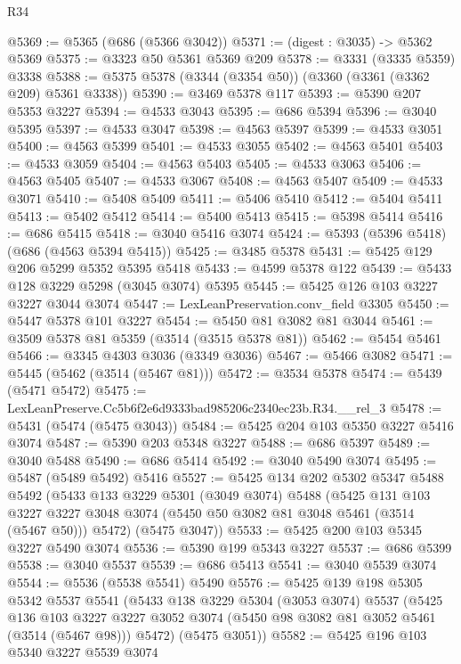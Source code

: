 \begin{lexlean}{R34}
\begin{coremodule}
@5369 := @5365 (@686 (@5366 @3042))
@5371 := (digest : @3035) -> @5362 @5369
@5375 := @3323 @50 @5361 @5369 @209
@5378 := @3331 (@3335 @5359) @3338
@5388 := @5375 @5378 (@3344 (@3354 @50)) (@3360 (@3361 (@3362 @209) @5361 @3338))
@5390 := @3469 @5378 @117
@5393 := @5390 @207 @5353 @3227
@5394 := @4533 @3043
@5395 := @686 @5394
@5396 := @3040 @5395
@5397 := @4533 @3047
@5398 := @4563 @5397
@5399 := @4533 @3051
@5400 := @4563 @5399
@5401 := @4533 @3055
@5402 := @4563 @5401
@5403 := @4533 @3059
@5404 := @4563 @5403
@5405 := @4533 @3063
@5406 := @4563 @5405
@5407 := @4533 @3067
@5408 := @4563 @5407
@5409 := @4533 @3071
@5410 := @5408 @5409
@5411 := @5406 @5410
@5412 := @5404 @5411
@5413 := @5402 @5412
@5414 := @5400 @5413
@5415 := @5398 @5414
@5416 := @686 @5415
@5418 := @3040 @5416 @3074
@5424 := @5393 (@5396 @5418) (@686 (@4563 @5394 @5415))
@5425 := @3485 @5378
@5431 := @5425 @129 @206 @5299 @5352 @5395 @5418
@5433 := @4599 @5378 @122
@5439 := @5433 @128 @3229 @5298 (@3045 @3074) @5395
@5445 := @5425 @126 @103 @3227 @3227 @3044 @3074
@5447 := LexLeanPreservation.conv_field @3305
@5450 := @5447 @5378 @101 @3227
@5454 := @5450 @81 @3082 @81 @3044
@5461 := @3509 @5378 @81 @5359 (@3514 (@3515 @5378 @81))
@5462 := @5454 @5461
@5466 := @3345 @4303 @3036 (@3349 @3036)
@5467 := @5466 @3082
@5471 := @5445 (@5462 (@3514 (@5467 @81)))
@5472 := @3534 @5378
@5474 := @5439 (@5471 @5472)
@5475 := LexLeanPreserve.Cc5b6f2e6d9333bad985206c2340ec23b.R34.__rel_3
@5478 := @5431 (@5474 (@5475 @3043))
@5484 := @5425 @204 @103 @5350 @3227 @5416 @3074
@5487 := @5390 @203 @5348 @3227
@5488 := @686 @5397
@5489 := @3040 @5488
@5490 := @686 @5414
@5492 := @3040 @5490 @3074
@5495 := @5487 (@5489 @5492) @5416
@5527 := @5425
    @134
    @202
    @5302
    @5347
    @5488
    @5492
    (@5433
      @133
      @3229
      @5301
      (@3049 @3074)
      @5488
      (@5425
        @131
        @103
        @3227
        @3227
        @3048
        @3074
        (@5450 @50 @3082 @81 @3048 @5461 (@3514 (@5467 @50)))
        @5472)
      (@5475 @3047))
@5533 := @5425 @200 @103 @5345 @3227 @5490 @3074
@5536 := @5390 @199 @5343 @3227
@5537 := @686 @5399
@5538 := @3040 @5537
@5539 := @686 @5413
@5541 := @3040 @5539 @3074
@5544 := @5536 (@5538 @5541) @5490
@5576 := @5425
    @139
    @198
    @5305
    @5342
    @5537
    @5541
    (@5433
      @138
      @3229
      @5304
      (@3053 @3074)
      @5537
      (@5425
        @136
        @103
        @3227
        @3227
        @3052
        @3074
        (@5450 @98 @3082 @81 @3052 @5461 (@3514 (@5467 @98)))
        @5472)
      (@5475 @3051))
@5582 := @5425 @196 @103 @5340 @3227 @5539 @3074

\end{coremodule}
\end{lexlean}
